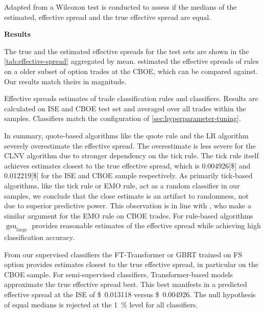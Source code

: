 Adapted from \textcite[][12]{theissenTestAccuracyLee2000} a Wilcoxon test is conducted to assess if the medians of the estimated, effective spread and the true effective spread are equal.

\textbf{Results}

The true and the estimated effective spreads for the test sets are shown in the \cref{tab:effective-spread} aggregated by mean. \textcite[][896--897]{savickasInferringDirectionOption2003} estimated the effective spreads of rules on a older subset of option trades at the \gls{CBOE}, which can be compared against. Our results match theirs in magnitude.

\begin{table}[!ht]
    \centering
    
    \caption[Effective Spreads Estimates]{Effective spreads estimates of trade classification rules and classifiers. Results are calculated on \gls{ISE} and \gls{CBOE} test set and averaged over all trades within the samples. Classifiers match the configuration of \cref{sec:hyperparameter-tuning}.}
    \label{tab:effective-spread}
\end{table}

In summary, quote-based algorithms like the quote rule and the \gls{LR} algorithm severely overestimate the effective spread. The overestimate is less severe for the \gls{CLNV} algorithm due to stronger dependency on the tick rule. The tick rule itself achieves estimates closest to the true effective spread, which is \num[round-mode=places, round-precision=3]{0.004926}[\$]{} and \num[round-mode=places, round-precision=3]{0.012219}[\$]{} for the \gls{ISE} and \gls{CBOE} sample respectively. As primarily tick-based algorithms, like the tick rule or \gls{EMO} rule, act as a random classifier in our samples, we conclude that the close estimate is an artifact to randomness, not due to superior predictive power. This observation is in line with \textcite[][897]{savickasInferringDirectionOption2003}, who make a similar argument for the \gls{EMO} rule on \gls{CBOE} trades. For rule-based algorithms $\operatorname{gsu}_{\mathrm{large}}$ provides reasonable estimates of the effective spread while achieving high classification accuracy.

From our supervised classifiers the FT-Transformer or \gls{GBRT} trained on \gls{FS} option provides estimates closest to the true effective spread, in particular on the \gls{CBOE} sample. For semi-supervised classifiers, Transformer-based models approximate the true effective spread best. This best manifests in a predicted effective spread at the \gls{ISE} of \SI[round-mode=places, round-precision=3]{0.013118}[\$]{} versus \SI[round-mode=places, round-precision=3]{0.004926}[\$]{}. The null hypothesis of equal medians is rejected at the \SI{1}{\percent} level for all classifiers.

